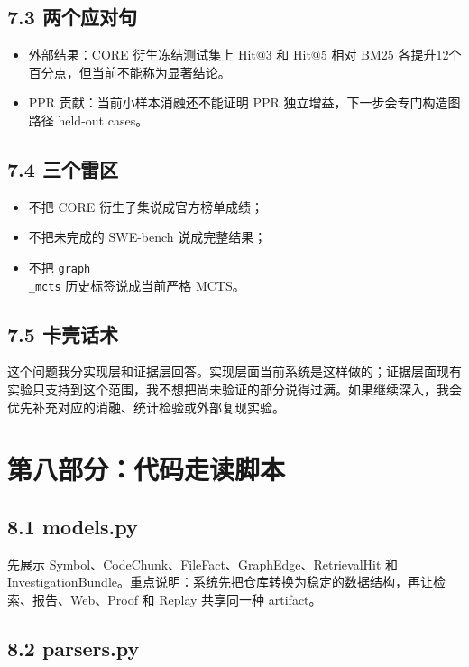 \documentclass[UTF8,12pt,openany]{ctexbook}
\begin{document}
\section{7.3 两个应对句}

\begin{itemize}
\item 外部结果：CORE 衍生冻结测试集上 Hit@3 和 Hit@5 相对 BM25 各提升12个百分点，但当前不能称为显著结论。
\item PPR 贡献：当前小样本消融还不能证明 PPR 独立增益，下一步会专门构造图路径 held-out cases。
\end{itemize}

\section{7.4 三个雷区}

\begin{itemize}
\item 不把 CORE 衍生子集说成官方榜单成绩；
\item 不把未完成的 SWE-bench 说成完整结果；
\item 不把 \texttt{graph\\_mcts} 历史标签说成当前严格 MCTS。
\end{itemize}

\section{7.5 卡壳话术}

这个问题我分实现层和证据层回答。实现层面当前系统是这样做的；证据层面现有实验只支持到这个范围，我不想把尚未验证的部分说得过满。如果继续深入，我会优先补充对应的消融、统计检验或外部复现实验。\par

\clearpage
\chapter{第八部分：代码走读脚本}

\section{8.1 models.py}

先展示 Symbol、CodeChunk、FileFact、GraphEdge、RetrievalHit 和 InvestigationBundle。重点说明：系统先把仓库转换为稳定的数据结构，再让检索、报告、Web、Proof 和 Replay 共享同一种 artifact。\par

\section{8.2 parsers.py}
\end{document}
